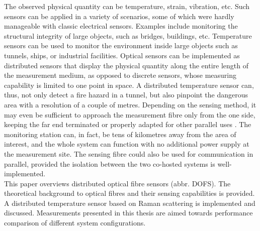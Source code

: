 \documentclass{standalone}
\begin{document}
The observed physical quantity can be temperature, strain, vibration, etc. Such sensors can be applied in a variety of scenarios, some of which were hardly manageable with classic electrical sensors. Examples include monitoring the structural integrity of large objects, such as bridges, buildings, etc. Temperature sensors can be used to monitor the environment inside large objects such as tunnels, ships, or industrial facilities. Optical sensors can be implemented as distributed sensors that display the physical quantity along the entire length of the measurement medium, as opposed to discrete sensors, whose measuring capability is limited to one point in space. A distributed temperature sensor can, thus, not only detect a fire hazard in a tunnel, but also pinpoint the dangerous area with a resolution of a couple of metres. Depending on the sensing method, it may even be sufficient to approach the measurement fibre only from the one side, keeping the far end terminated or properly adapted for other parallel uses \cite{fer:oks}. The monitoring station can, in fact, be tens of kilometres away from the area of interest, and the whole system can function with no additional power supply at the measurement site. The sensing fibre could also be used for communication in parallel, provided the isolation between the two co-hosted systems is well-implemented. \\

This paper overviews distributed optical fibre sensors (abbr. DOFS). The theoretical background to optical fibres and their sensing capabilities is provided. A distributed temperature sensor based on Raman scattering is implemented and discussed. Measurements presented in this thesis are aimed towards performance comparison of different system configurations.



\setcounter{stranica}{\thepage}
\addtocounter{stranica}{1}
\end{document}

